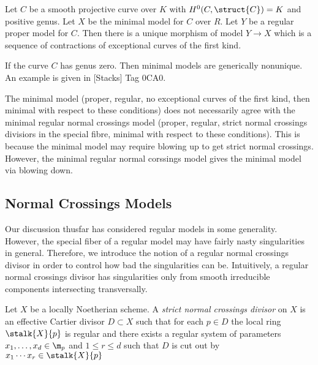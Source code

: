\begin{prop}[Tag 0C9Z]
Let $C$ be a smooth projective curve over $K$ with $H^0(C, \struct{C}) = K$ and positive genus. Let $X$ be the minimal model for $C$ over $R$. Let $Y$ be a regular proper model for $C$. Then there is a unique morphism of model $Y \to X$ which is a sequence of contractions of exceptional curves of the first kind. 
\end{prop}

\begin{remark}
If the curve $C$ has genus zero. Then minimal models are generically nonunique. An example is given in [Stacks] Tag 0CA0. 
\end{remark}

\begin{remark}
The minimal model (proper, regular, no exceptional curves of the first kind, then minimal with respect to these conditions) does not necessarily agree with the minimal regular normal crossings model (proper, regular, strict normal  crossings divisiors in the special fibre, minimal with respect to these conditions). This is because the minimal model may require blowing up to get strict normal crossings. However, the minimal regular normal corssings model gives the minimal model via blowing down. 
\end{remark}

\subsection{Normal Crossings Models}

Our discussion thusfar has considered regular models in some generality. However, the special fiber of a regular model may have fairly nasty singularities in general. Therefore, we introduce the notion of a regular normal crossings divisor in order to control how bad the singularities can be. Intuitively, a regular normal crossings divisor has singularities only from smooth irreducible components intersecting transversally.

\begin{definition}
Let $X$ be a locally Noetherian scheme. A \textit{strict normal crossings divisor} on $X$ is an effective Cartier divisor $D \subset X$ such that for each $p \in D$ the local ring $\stalk{X}{p}$ is regular and there exists a regular system of parameters $x_1, \dots, x_d \in \m_p$ and $1 \le r \le d$ such that $D$ is cut out by $x_1 \cdots x_r \in \stalk{X}{p}$ 
\end{definition}

